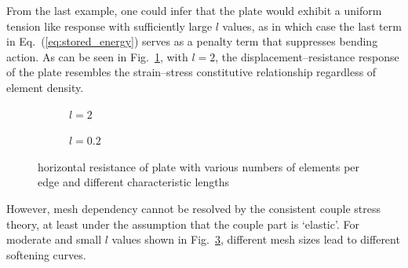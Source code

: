 \documentclass[3p,sort&compress,11pt,fleqn,review]{elsarticle}
\newcommand*{\figref}[1]{Fig.~\ref{#1}}
\newcommand*{\eqsref}[1]{Eq.~(\ref{#1})}
\begin{document}
From the last example, one could infer that the plate would exhibit a uniform tension like response with sufficiently large $l$ values, as in which case the last term in \eqsref{eq:stored_energy} serves as a penalty term that suppresses bending action. As can be seen in \figref{fig:plate_resistance_large_l}, with $l=\num{2}$, the displacement--resistance response of the plate resembles the strain--stress constitutive relationship regardless of element density.
\begin{figure}[ht]
\centering\footnotesize
\begin{subfigure}[b]{.48\textwidth}\centering

\caption{$l=\num{2}$}\label{fig:plate_resistance_large_l}
\end{subfigure}\hfill
\begin{subfigure}[b]{.48\textwidth}\centering

\caption{$l=\num{0.2}$}\label{fig:plate_resistance_small_l}
\end{subfigure}
\caption{horizontal resistance of plate with various numbers of elements per edge and different characteristic lengths}
\end{figure}
However, mesh dependency cannot be resolved by the consistent couple stress theory, at least under the assumption that the couple part is `elastic'. For moderate and small $l$ values shown in \figref{fig:plate_resistance_small_l}, different mesh sizes lead to different softening curves.
\end{document}
